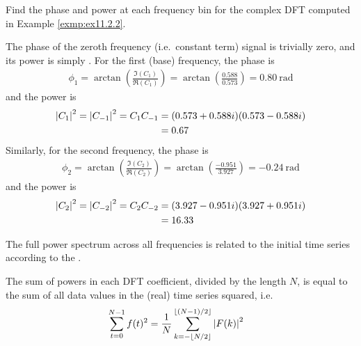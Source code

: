 \begin{exmp}
Find the phase and power at each frequency bin for the complex DFT computed in Example \ref{exmp:ex11.2.2}.   
\end{exmp}
\begin{solution}
The phase of the zeroth frequency (i.e.\ constant term) signal is trivially zero, and its power is simply . For the first (base) frequency, the phase is
\begin{align*}
\phi_1 = \arctan(\frac{\Im(C_1)}{\Re(C_1)}) = \arctan(\frac{0.588}{0.573}) = \SI{0.80}{\radian}
\end{align*}
and the power is
\begin{align*}
\abs{C_1}^2 = \abs{C_{-1}}^2 = C_1C_{-1} &= (0.573 + 0.588i)(0.573 - 0.588i) \\
&= 0.67
\end{align*}
Similarly, for the second frequency, the phase is
\begin{align*}
\phi_2 = \arctan(\frac{\Im(C_2)}{\Re(C_2)}) = \arctan(\frac{-0.951}{3.927}) = \SI{-0.24}{\radian}
\end{align*}
and the power is
\begin{align*}
\abs{C_2}^2 = \abs{C_{-2}}^2 = C_2C_{-2} &= (3.927 - 0.951i)(3.927 + 0.951i) \\
&= 16.33
\end{align*}
\end{solution}
The full power spectrum across all frequencies is related to the initial time series according to the .
\begin{thm}
\label{thm:DFTParseval}
The sum of powers in each DFT coefficient, divided by the length $N$, is equal to the sum of all data values in the (real) time series squared, i.e.\
\begin{align}
\sum_{t=0}^{N-1} f(t)^2 &= \frac{1}{N} \sum_{k= -\lfloor N/2 \rfloor}^{\lfloor (N-1)/2 \rfloor} \abs{F(k)}^2 \label{eqn:Parseval}
\end{align}
\end{thm}
